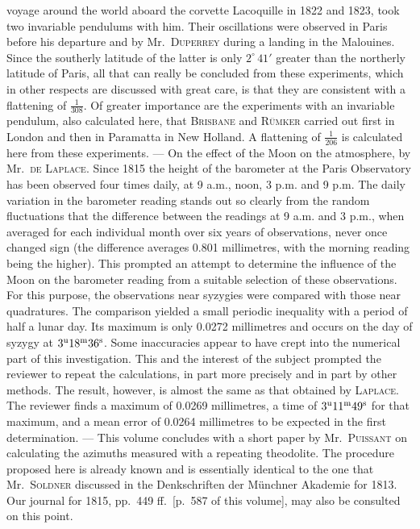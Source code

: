 voyage around the world aboard the corvette Lacoquille in 1822 and 1823, took two invariable pendulums with him. Their oscillations were observed in Paris before his departure and by Mr.\ \textsc{Duperrey} during a landing in the Malouines. Since the southerly latitude of the latter is only $2^\circ\,41'$ greater than the northerly latitude of Paris, all that can really be concluded from these experiments, which in other respects are discussed with great care, is that they are consistent with a flattening of $\frac{1}{308}$. Of greater importance are the experiments with an invariable pendulum, also calculated here, that \textsc{Brisbane} and \textsc{Rümker} carried out first in London and then in Paramatta in New Holland. A flattening of $\frac{1}{206}$ is calculated here from these experiments. --- On the effect of the Moon on the atmosphere, by Mr.\ \textsc{de Laplace}. Since 1815 the height of the barometer at the Paris Observatory has been observed four times daily, at 9 a.m., noon, 3 p.m. and 9 p.m. The daily variation in the barometer reading stands out so clearly from the random fluctuations that the difference between the readings at 9 a.m. and 3 p.m., when averaged for each individual month over six years of observations, never once changed sign (the difference averages 0.801 millimetres, with the morning reading being the higher). This prompted an attempt to determine the influence of the Moon on the barometer reading from a suitable selection of these observations. For this purpose, the observations near syzygies were compared with those near quadratures. The comparison yielded a small periodic inequality with a period of half a lunar day. Its maximum is only 0.0272 millimetres and occurs on the day of syzygy at $3^{\rm u}18^{\rm m}36^{\rm s}$. Some inaccuracies appear to have crept into the numerical part of this investigation. This and the interest of the subject prompted the reviewer to repeat the calculations, in part more precisely and in part by other methods. The result, however, is almost the same as that obtained by \textsc{Laplace}. The reviewer finds a maximum of 0.0269 millimetres, a time of $3^{\rm u}11^{\rm m}49^{\rm s}$ for that maximum, and a mean error of 0.0264 millimetres to be expected in the first determination. --- This volume concludes with a short paper by Mr.\ \textsc{Puissant} on calculating the azimuths measured with a repeating theodolite. The procedure proposed here is already known and is essentially identical to the one that Mr.\ \textsc{Soldner} discussed in the Denkschriften der Münchner Akademie for 1813. Our journal for 1815, pp.\ 449 ff.\ [p.\ 587 of this volume], may also be consulted on this point.
